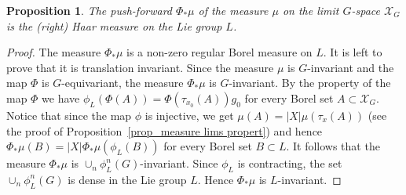 \documentclass[12pt]{article}
\newcommand{\limGs}[1][G]{\mathcal{X}_{#1}}
\newtheorem{prop}[theor]{Proposition}
\theoremstyle{definition}
\begin{document}
\begin{prop}\label{haar}
The push-forward $\Phi_*\mu$ of the measure $\mu$ on the limit $G$-space $\limGs$ is the (right)
Haar measure on the Lie group $L$.
%
\end{prop}
\begin{proof}
The measure $\Phi_*\mu$ is a non-zero regular Borel measure on $L$. It is left to prove that it is
translation invariant. Since the measure $\mu$ is $G$-invariant and the map $\Phi$ is
$G$-equivariant, the measure $\Phi_*\mu$ is $G$-invariant. By the property of the map $\Phi$ we
have $\phi_L(\Phi(A))=\Phi(\tau_{x_0}(A))g_0$ for every Borel set $A\subset\limGs$. Notice that
since the map $\phi$ is injective, we get $\mu(A)=|X|\mu(\tau_x(A))$ (see the proof of
Proposition~\ref{prop_measure lims propert}) and hence $\Phi_*\mu(B)=|X|\Phi_*\mu(\phi_L(B))$ for
every Borel set $B\subset L$. It follows that the measure $\Phi_*\mu$ is $\cup_n
\phi_L^n(G)$-invariant. Since $\phi_L$ is contracting, the set $\cup_n \phi_L^n(G)$ is dense in the
Lie group $L$. Hence $\Phi_*\mu$ is $L$-invariant.
\end{proof}

\end{document}
